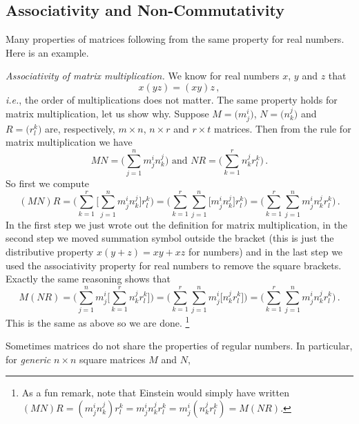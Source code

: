 \subsection{Associativity and Non-Commutativity }

Many properties of matrices following from the same property for real numbers. Here is an example.

\begin{example}
{\it Associativity of matrix multiplication.} We know for real numbers $x$, $y$ and $z$ that 
$$
x(yz)=(xy)z\, ,
$$
{\it i.e.}, the order of multiplications does not matter. The same property holds for matrix multiplication, let us show why.
Suppose $M=\big( m^i_j \big)$, $N=\big( n^j_k \big)$ and  $R=\big( r^k_l \big)$ are, 
respectively, $m\times n$, $n\times r$ and $r\times t$ matrices. Then from the rule for matrix
multiplication we have
$$
MN=\Big(\sum_{j=1}^n m^i_j n^j_k\Big)\mbox{ and } NR=\Big(\sum_{k=1}^r n^j_k r^k_l\Big)\, .
$$
So first we compute 
$$
(MN)R=\Big(\sum_{k=1}^r \Big[\sum_{j=1}^n m^i_j n^j_k\Big] r^k_l \Big) = 
\Big(\sum_{k=1}^r \sum_{j=1}^n \Big[ m^i_j n^j_k\Big] r^k_l \Big) =\Big(\sum_{k=1}^r \sum_{j=1}^n m^i_j n^j_k r^k_l \Big)\, .
$$
In the first step we just wrote out the definition for matrix multiplication, in the second step we
moved summation symbol outside the bracket (this is just the distributive
property $x(y+z)=xy+xz$ for numbers) and
in the last step we used the associativity property for real numbers to remove the square brackets. 
Exactly the same reasoning shows that
$$
M(NR)=\Big(\sum_{j=1}^n m^i_j\Big[\sum_{k=1}^r n^j_k r^k_l\Big]\Big) = 
\Big(\sum_{k=1}^r \sum_{j=1}^n  m^i_j \Big[n^j_kr^k_l \Big] \Big) =\Big(\sum_{k=1}^r \sum_{j=1}^n m^i_j n^j_k r^k_l \Big)\, .
$$
This is the same as above so we are done. \footnote{As a fun remark, note that Einstein would simply have written\\
$(MN)R=(m^i_j n^j_k) r^k_l= m^i_j n^j_k r^k_l = m^i_j (n^j_k r^k_l ) = M(NR)$.}
\end{example}


Sometimes matrices do not share the properties of regular numbers. 
In particular, for {\it generic} $n\times n$ square matrices $M$ and $N$, 
\begin{center}
\end{center}



